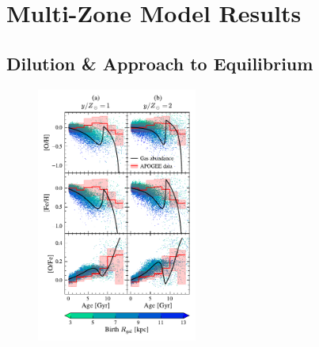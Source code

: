 \documentclass[twocolumn,twocolappendix,linenumbers]{aastex631}
\newcommand{\onecolumn}{0.47\textwidth}
\begin{document}
\section{Multi-Zone Model Results}
\label{sec:multizone-results}

\subsection{Dilution \& Approach to Equilibrium}
\label{sec:age-abundance}

\begin{figure}
    \centering
    \includegraphics[width=\onecolumn]{figures/abundance_evolution_yields.pdf}

\end{figure}
\end{document}
